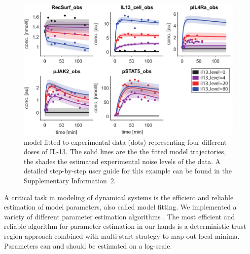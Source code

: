 \documentclass{bioinfo}
\begin{document}
\begin{figure}[!tpb]%
\centerline{\includegraphics[width=\linewidth]{Figure_D2D_AppNote_v2a.pdf}}
\caption{\citet{Raia:2011vn} model fitted to experimental data (dots) representing four different doses of IL-13. The solid lines are the the fitted model trajectories, the shades the estimated experimental noise levels of the data. A detailed step-by-step user guide for this example can be found in the Supplementary Information~2.}\label{fig:01}
\end{figure}
A critical task in modeling of dynamical systems is the efficient and reliable estimation of model parameters, also called model fitting. We implemented a variety of different parameter estimation algorithms \citep{Raue:2012zt}. The most efficient and reliable algorithm for parameter estimation in our hands is a deterministic trust region approach combined with multi-start strategy to map out local minima. Parameters can and should be estimated on a log-scale. %
\end{document}
